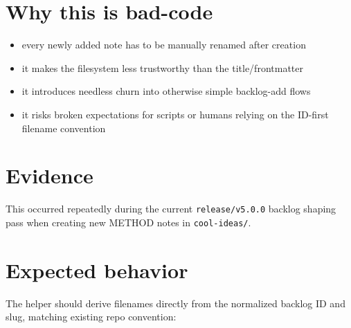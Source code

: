 \section{Why this is bad-code}\label{record-406-why-this-is-bad-code}

\begin{itemize}
\tightlist
\item
  every newly added note has to be manually renamed after creation
\item
  it makes the filesystem less trustworthy than the title/frontmatter
\item
  it introduces needless churn into otherwise simple backlog-add flows
\item
  it risks broken expectations for scripts or humans relying on the ID-first filename convention
\end{itemize}

\section{Evidence}\label{record-406-evidence}

This occurred repeatedly during the current \texttt{r\allowbreak{}e\allowbreak{}l\allowbreak{}e\allowbreak{}a\allowbreak{}s\allowbreak{}e\allowbreak{}/\allowbreak{}v\allowbreak{}5\allowbreak{}.\allowbreak{}0\allowbreak{}.\allowbreak{}0} backlog shaping pass when creating new METHOD notes in \texttt{c\allowbreak{}o\allowbreak{}o\allowbreak{}l\allowbreak{}-\allowbreak{}i\allowbreak{}d\allowbreak{}e\allowbreak{}a\allowbreak{}s\allowbreak{}/}.

\section{Expected behavior}\label{record-406-expected-behavior}

The helper should derive filenames directly from the normalized backlog ID and slug, matching existing repo convention:

